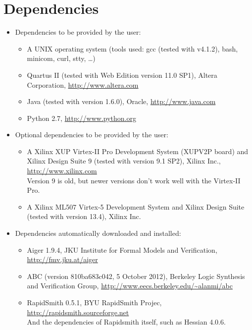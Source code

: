 \documentclass[a4paper,oneside]{memoir}
\begin{document}
\section{Dependencies}
\begin{itemize}
\item Dependencies to be provided by the user:
\begin{itemize}
\item A UNIX operating system (tools used: gcc (tested with v4.1.2), bash, minicom, curl, stty, \dots)
\item Quartus II (tested with Web Edition version 11.0 SP1), Altera Corporation, \url{http://www.altera.com}
\item Java (tested with version 1.6.0), Oracle, \url{http://www.java.com}
\item Python 2.7, \url{http://www.python.org}
\end{itemize}
\item Optional dependencies to be provided by the user:
\begin{itemize}
\item A Xilinx XUP Virtex-II Pro Development System (XUPV2P board) and Xilinx Design Suite 9 (tested with version 9.1 SP2), Xilinx Inc., \url{http://www.xilinx.com}\\ %
Version 9 is old, but newer versions don't work well with the Virtex-II Pro.
\item A Xilinx ML507 Virtex-5 Development System and Xilinx Design Suite (tested with version 13.4), Xilinx Inc.
\end{itemize}
\item Dependencies automatically downloaded and installed:
\begin{itemize}
\item Aiger 1.9.4, JKU Institute for Formal Models and Verification, \url{http://fmv.jku.at/aiger}
\item ABC (version 810ba683c042, 5 October 2012), Berkeley Logic Synthesis and Verification Group, \url{http://www.eecs.berkeley.edu/\~alanmi/abc}
\item RapidSmith 0.5.1, BYU RapidSmith Projec,  \url{http://rapidsmith.sourceforge.net}\\
And the dependencies of Rapidsmith itself, such as Hessian 4.0.6.
\end{itemize}
\end{itemize}
\end{document}
